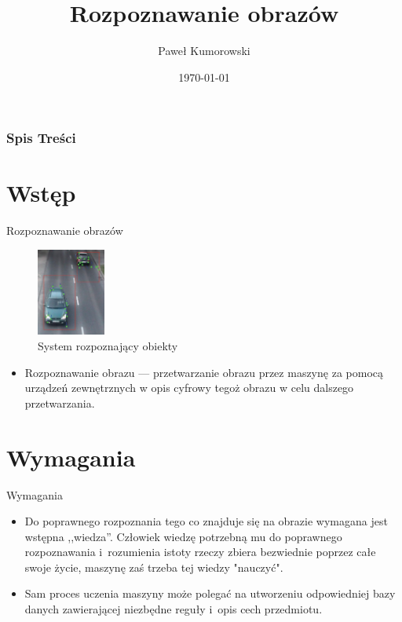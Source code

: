 \documentclass{beamer}
\title{Rozpoznawanie obrazów}
\author{Paweł Kumorowski}
\date{\today}
\begin{document}
\frame{\titlepage}


\begin{frame}
\frametitle{Spis Treści}
\tableofcontents
\end{frame}


\section{Wstęp}
\begin{frame}{Rozpoznawanie obrazów}

\begin{figure}
	\centering
		\includegraphics[width=0.2\textwidth]{samochod.jpg}
		\caption{System rozpoznający obiekty}
\end{figure}

\begin{itemize}
\item Rozpoznawanie obrazu --- przetwarzanie obrazu przez maszynę za pomocą urządzeń zewnętrznych w opis cyfrowy tegoż obrazu w celu dalszego przetwarzania.
\end{itemize}
\end{frame}


\section{Wymagania}
\begin{frame}{Wymagania}
\begin{itemize}
\item Do poprawnego rozpoznania tego co znajduje się na obrazie wymagana jest wstępna ,,wiedza''. Człowiek wiedzę potrzebną mu do poprawnego rozpoznawania i~rozumienia istoty rzeczy zbiera bezwiednie poprzez całe swoje życie, maszynę zaś trzeba tej wiedzy "nauczyć".
\pause
\item Sam proces uczenia maszyny może polegać na utworzeniu odpowiedniej bazy danych zawierającej niezbędne reguły i~opis cech przedmiotu.
\end{itemize}
\end{frame}
\end{document}
